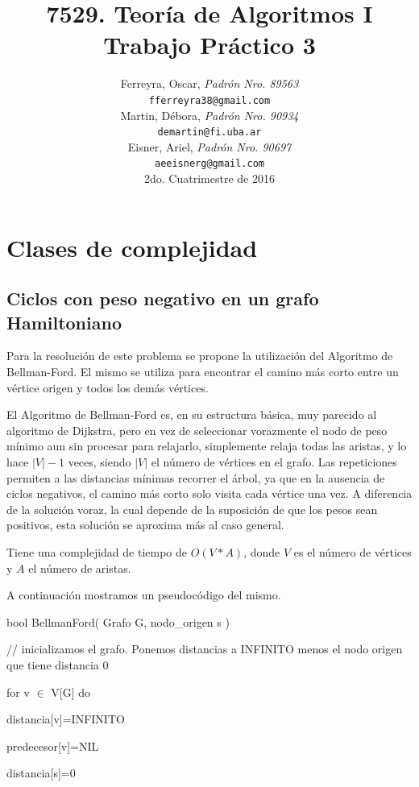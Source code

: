 \documentclass[a4paper,10pt]{article}
\title{
\textbf{ 
	7529. Teoría de Algoritmos I\\
	Trabajo Práctico 3
	}
}
\author{ Ferreyra, Oscar, \textit{Padrón Nro. 89563} \\
\texttt{ fferreyra38@gmail.com } \\[2.5ex]
Martin, Débora, \textit{Padrón Nro. 90934} \\
\texttt{ demartin@fi.uba.ar } \\[2.5ex]
Eisner, Ariel, \textit{Padrón Nro. 90697} \\
\texttt{ aeeisnerg@gmail.com } \\[2.5ex]
\normalsize{2do. Cuatrimestre de 2016} \\
}
\date{}
\begin{document}
\maketitle

\thispagestyle{empty} %
\setcounter{page}{0}
\newpage
\tableofcontents

\newpage

\section{Clases de complejidad}


\subsection{Ciclos con peso negativo en un grafo Hamiltoniano}
Para la resolución de este problema se propone la utilización del Algoritmo de Bellman-Ford. El mismo se utiliza para encontrar el camino más corto entre un vértice origen y todos los demás vértices.

El Algoritmo de Bellman-Ford es, en su estructura básica, muy parecido al algoritmo de Dijkstra, pero en vez de seleccionar vorazmente el nodo de peso mínimo aun sin procesar para relajarlo, simplemente relaja todas las aristas, y lo hace \(|V|-1\) veces, siendo \(|V|\) el número de vértices en el grafo. Las repeticiones permiten a las distancias mínimas recorrer el árbol, ya que en la ausencia de ciclos negativos, el camino más corto solo visita cada vértice una vez. A diferencia de la solución voraz, la cual depende de la suposición de que los pesos sean positivos, esta solución se aproxima más al caso general.

Tiene una complejidad de tiempo de \(O(V*A)\), donde \(V\) es el número de vértices y \(A\) el número de aristas.

A continuación mostramos un pseudocódigo del mismo.

\bigskip

bool BellmanFord( Grafo G, nodo\_origen s )

\quad // inicializamos el grafo. Ponemos distancias a INFINITO menos el nodo origen que tiene distancia 0

\quad for v \(\in\) V[G] do
           
\quad \quad distancia[v]=INFINITO
           
\quad\quad  predecesor[v]=NIL
       
\quad distancia[s]=0
      
\end{document}
